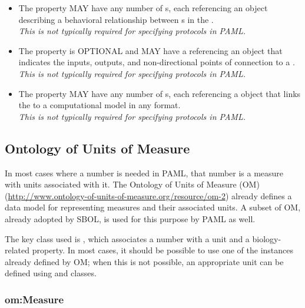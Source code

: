 \begin{itemize}
\item \label{sec:sbol:hasInteraction}
The  property MAY have any number of s, each referencing an  object describing a behavioral relationship between s in the .
\\{\em This is not typically required for specifying protocols in PAML.}

\item \label{sec:sbol:hasInterface}
The  property is OPTIONAL and MAY have a  referencing an  object that indicates the inputs, outputs, and non-directional points of connection to a .
\\{\em This is not typically required for specifying protocols in PAML.}

\item \label{sec:sbol:hasModel}
The  property MAY have any number of s, each referencing a  object that links the  to a computational model in any format.
\\{\em This is not typically required for specifying protocols in PAML.}
\end{itemize}


\subsection{Ontology of Units of Measure}

In most cases where a number is needed in PAML, that number is a measure with units associated with it.
The Ontology of Units of Measure (OM) (\url{http://www.ontology-of-units-of-measure.org/resource/om-2}) already defines a data model for representing measures and their associated units. 
A subset of OM, already adopted by SBOL, is used for this purpose by PAML as well.

The key class used is , which associates a number with a unit and a biology-related property.
In most cases, it should be possible to use one of the  instances already defined by OM; when this is not possible, an appropriate unit can be defined using  and  classes.

\subsubsection{om:Measure} \label{sec:om:Measure}

